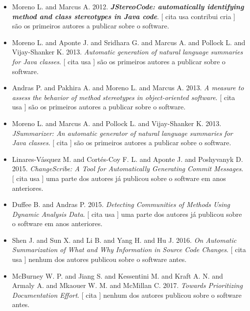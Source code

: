 \begin{itemize}
\item Moreno L. and Marcus A.
      2012.
        \textbf{\textit{ JStereoCode: automatically identifying method and class stereotypes in Java code}}.
      [
          cita
          usa
          contribui
          cria
      ]
são os primeiros autores a publicar sobre o software.
\item Moreno L. and Aponte J. and Sridhara G. and Marcus A. and Pollock L. and Vijay-Shanker K.
      2013.
        \textit{ Automatic generation of natural language summaries for Java classes}.
      [
          cita
          usa
      ]
são os primeiros autores a publicar sobre o software.
\item Andras P. and Pakhira A. and Moreno L. and Marcus A.
      2013.
        \textit{ A measure to assess the behavior of method stereotypes in object-oriented software}.
      [
          cita
          usa
      ]
são os primeiros autores a publicar sobre o software.
\item Moreno L. and Marcus A. and Pollock L. and Vijay-Shanker K.
      2013.
        \textit{ JSummarizer: An automatic generator of natural language summaries for Java classes}.
      [
          cita
      ]
são os primeiros autores a publicar sobre o software.
\item Linares-V\'{a}squez M. and Cort{\'e}s-Coy F. L. and Aponte J. and Poshyvanyk D.
      2015.
        \textit{ ChangeScribe: A Tool for Automatically Generating Commit Messages}.
      [
          cita
          usa
      ]
uma parte dos autores já publicou sobre o software em anos anteriores.
\item Duffee B. and Andras P.
      2015.
        \textit{ Detecting Communities of Methods Using Dynamic Analysis Data}.
      [
          cita
          usa
      ]
uma parte dos autores já publicou sobre o software em anos anteriores.
\item Shen J. and Sun X. and Li B. and Yang H. and Hu J.
      2016.
        \textit{ On Automatic Summarization of What and Why Information in Source Code Changes}.
      [
          cita
          usa
      ]
nenhum dos autores publicou sobre o software antes.
\item McBurney W. P. and Jiang S. and Kessentini M. and Kraft A. N. and Armaly A. and Mkaouer W. M. and McMillan C.
      2017.
        \textit{ Towards Prioritizing Documentation Effort}.
      [
          cita
      ]
nenhum dos autores publicou sobre o software antes.
\end{itemize}
